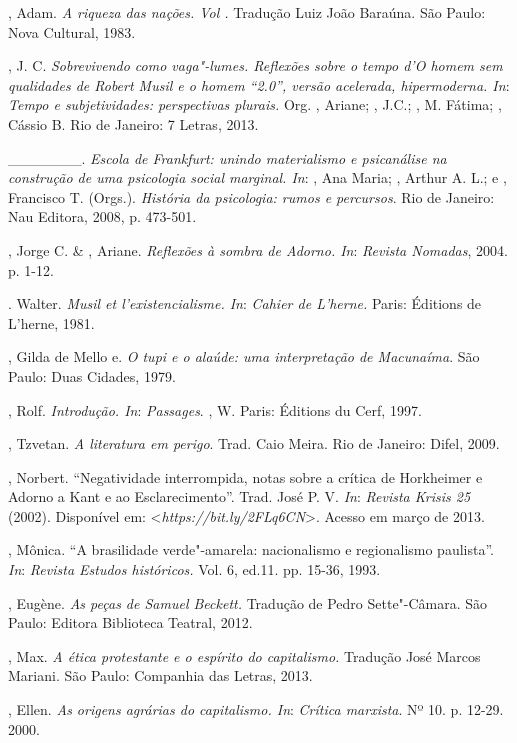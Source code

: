 \begin{Parskip}
, Adam. \emph{A riqueza das nações. Vol .} Tradução Luiz João
Baraúna. São Paulo: Nova Cultural, 1983.

, J. C. \emph{Sobrevivendo como vaga"-lumes. Reflexões sobre o tempo
d'\emph{O homem sem qualidades} de Robert Musil e o homem ``2.0'',
versão acelerada, hipermoderna. In}: \emph{Tempo e subjetividades:
perspectivas plurais.} Org. , Ariane; , J.C.; , M.
Fátima; , Cássio B. Rio de Janeiro: 7 Letras, 2013.

\_\_\_\_\_\_\_. \emph{Escola de Frankfurt: unindo materialismo e psicanálise
na construção de uma psicologia social marginal. In}: , Ana Maria; , Arthur A. L.; e , Francisco T. (Orgs.). \emph{História da psicologia: rumos e percursos}. Rio de Janeiro: Nau Editora, 2008, p. 473-501.

, Jorge C. \& , Ariane. \emph{Reflexões à sombra de
Adorno. In}: \emph{Revista Nomadas}, 2004. p. 1-12.

. Walter. \emph{Musil et l'existencialisme. In}: \emph{Cahier de
L'herne.} Paris: Éditions de L'herne, 1981.

, Gilda de Mello e. \emph{O tupi e o alaúde: uma interpretação de
Macunaíma}. São Paulo: Duas Cidades, 1979.

, Rolf. \emph{Introdução. In}: \emph{Passages}. , W.
Paris: Éditions du Cerf, 1997.

, Tzvetan. \emph{A literatura em perigo}. Trad. Caio Meira. Rio
de Janeiro: Difel, 2009.

, Norbert. ``Negatividade interrompida, notas sobre a crítica de
Horkheimer e Adorno a Kant e ao Esclarecimento''. Trad. José P. V. \emph{In}:
\emph{Revista Krisis 25} (2002). Disponível em:
\textless{}\emph{https://bit.ly/2FLq6CN}\textgreater{}. Acesso em março de 2013.

, Mônica. ``A brasilidade verde"-amarela: nacionalismo e
regionalismo paulista''. \emph{In}: \emph{Revista Estudos históricos.} Vol. 6,
ed.11. pp. 15-36, 1993.

, Eugène. \emph{As peças de Samuel Beckett.} Tradução de Pedro
Sette"-Câmara. São Paulo: Editora Biblioteca Teatral, 2012.

, Max. \emph{A ética protestante e o espírito do capitalismo.}
Tradução José Marcos Mariani. São Paulo: Companhia das Letras, 2013.

, Ellen. \emph{As origens agrárias do capitalismo. In}:
\emph{Crítica marxista}. Nº 10. p. 12-29. 2000.
\end{Parskip}